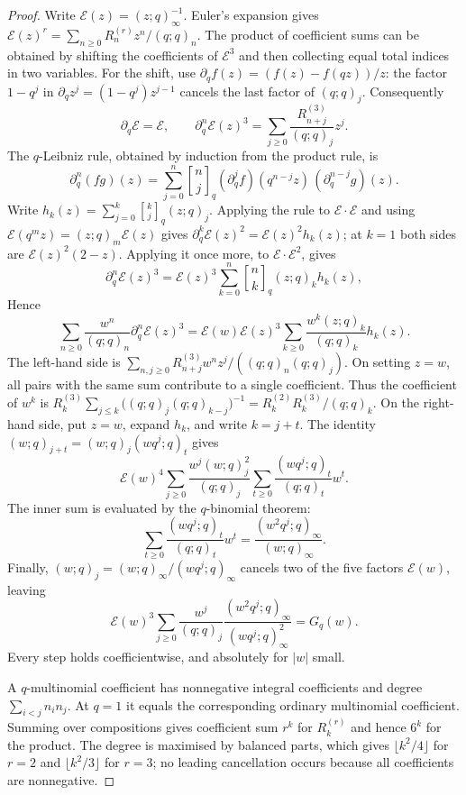 \documentclass[11pt]{article}
\begin{document}
\begin{proof}
Write $\mathcal E(z)=(z;q)_\infty^{-1}$. Euler's expansion gives
$\mathcal E(z)^r=\sum_{n\ge0}R_n^{(r)}z^n/(q;q)_n$.
The product of coefficient sums can be obtained by shifting the
coefficients of $\mathcal E^3$ and then collecting equal total
indices in two variables. For the shift, use
$\partial_qf(z)=(f(z)-f(qz))/z$: the factor $1-q^j$ in
$\partial_qz^j=(1-q^j)z^{j-1}$ cancels the last factor of
$(q;q)_j$. Consequently
\[
 \partial_q\mathcal E=\mathcal E,\qquad
 \partial_q^n\mathcal E(z)^3
 =\sum_{j\ge0}\frac{R_{n+j}^{(3)}}{(q;q)_j}z^j.
\]
The $q$-Leibniz rule, obtained by induction from the product rule, is
\[
 \partial_q^n(fg)(z)=\sum_{j=0}^n\genfrac{[}{]}{0pt}{}{n}{j}_q
 (\partial_q^jf)(q^{n-j}z)\,(\partial_q^{n-j}g)(z).
\]
Write $h_k(z)=\sum_{j=0}^k\genfrac{[}{]}{0pt}{}{k}{j}_q(z;q)_j$. Applying the
rule to $\mathcal E\cdot\mathcal E$ and using
$\mathcal E(q^mz)=(z;q)_m\mathcal E(z)$ gives
$\partial_q^k\mathcal E(z)^2=\mathcal E(z)^2h_k(z)$; at $k=1$ both sides are
$\mathcal E(z)^2(2-z)$. Applying it once more, to
$\mathcal E\cdot\mathcal E^2$, gives
\[
 \partial_q^n\mathcal E(z)^3
 =\mathcal E(z)^3\sum_{k=0}^n\genfrac{[}{]}{0pt}{}{n}{k}_q(z;q)_kh_k(z),
\]
Hence
\[
 \sum_{n\ge0}\frac{w^n}{(q;q)_n}\partial_q^n\mathcal E(z)^3
 =\mathcal E(w)\mathcal E(z)^3
  \sum_{k\ge0}\frac{w^k(z;q)_k}{(q;q)_k}h_k(z).
\]
The left-hand side is
$\sum_{n,j\ge0}R_{n+j}^{(3)}w^nz^j/((q;q)_n(q;q)_j)$.
On setting $z=w$, all pairs with the same sum contribute to a
single coefficient. Thus the coefficient of $w^k$ is
$R_k^{(3)}\sum_{j\le k}\bigl((q;q)_j(q;q)_{k-j}\bigr)^{-1}
=R_k^{(2)}R_k^{(3)}/(q;q)_k$.
On the right-hand side, put $z=w$, expand $h_k$, and write
$k=j+t$. The identity $(w;q)_{j+t}=(w;q)_j(wq^j;q)_t$ gives
\[
 \mathcal E(w)^4\sum_{j\ge0}\frac{w^j(w;q)_j^2}{(q;q)_j}
       \sum_{t\ge0}\frac{(wq^j;q)_t}{(q;q)_t}w^t.
\]
The inner sum is evaluated by the $q$-binomial theorem:
\[
 \sum_{t\ge0}\frac{(wq^j;q)_t}{(q;q)_t}w^t
 =\frac{(w^2q^j;q)_\infty}{(w;q)_\infty}.
\]
Finally, $(w;q)_j=(w;q)_\infty/(wq^j;q)_\infty$ cancels two
of the five factors $\mathcal E(w)$, leaving
\[
 \mathcal E(w)^3\sum_{j\ge0}\frac{w^j}{(q;q)_j}
       \frac{(w^2q^j;q)_\infty}{(wq^j;q)_\infty^2}
 =G_q(w).
\]
Every step holds coefficientwise, and absolutely for $|w|$ small.

A $q$-multinomial coefficient has nonnegative integral coefficients and degree
$\sum_{i<j}n_in_j$. At $q=1$ it equals the corresponding ordinary
multinomial coefficient. Summing over compositions gives coefficient sum $r^k$ for
$R_k^{(r)}$ and hence $6^k$ for the product. The degree is maximised by
balanced parts, which gives $\lfloor k^2/4\rfloor$ for $r=2$ and
$\lfloor k^2/3\rfloor$ for $r=3$; no leading cancellation occurs because all
coefficients are nonnegative.


\end{proof}
\end{document}
